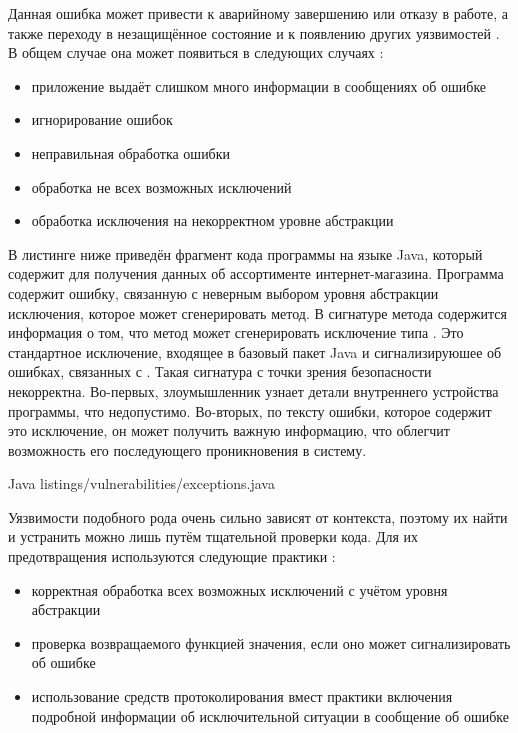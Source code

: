 %
Данная ошибка может привести к аварийному завершению или отказу  в работе, а также переходу в незащищённое состояние и к появлению других уязвимостей  . 
%
В общем случае она может появиться в следующих случаях :
\begin{itemize}
	\item приложение выдаёт слишком много информации в сообщениях об ошибке 
	\item игнорирование ошибок 
	\item неправильная обработка ошибки 
	\item обработка не всех возможных исключений 
	\item обработка исключения на некорректном уровне абстракции 
\end{itemize}

%
В листинге ниже приведён фрагмент кода программы на языке Java, который содержит  для получения данных об ассортименте интернет-магазина. 
%
Программа содержит ошибку, связанную с неверным выбором уровня абстракции исключения, которое может сгенерировать метод. 
%
В сигнатуре метода  содержится информация о том, что метод может сгенерировать исключение типа . 
%
Это стандартное исключение, входящее в базовый пакет Java и сигнализируюшее об ошибках, связанных 
с . 
%
Такая сигнатура с точки зрения безопасности некорректна. 
%
Во-первых, злоумышленник узнает детали внутреннего устройства программы, что недопустимо. 
%
Во-вторых, по тексту ошибки, которое содержит это исключение, он может получить важную информацию, что облегчит возможность его последующего проникновения в систему. 

	{Java}
	{listings/vulnerabilities/exceptions.java}

%
Уязвимости подобного рода очень сильно зависят от контекста, поэтому их найти и устранить можно лишь путём тщательной проверки кода. 
%
Для их предотвращения используются следующие практики : 
\begin{itemize}
	
	\item корректная обработка всех возможных исключений с учётом уровня абстракции 
	
	\item проверка возвращаемого функцией значения, если оно может сигнализировать об ошибке 
	
	\item использование средств протоколирования вмест практики включения подробной информации об исключительной ситуации в сообщение об ошибке 
\end{itemize}

